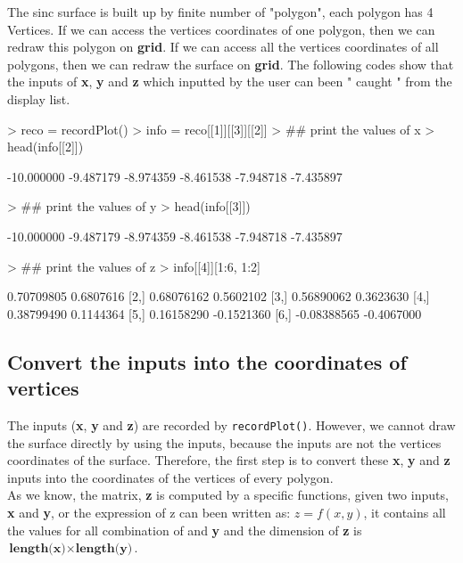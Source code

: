 \documentclass[11pt,twoside]{report}
\begin{document}
\newpage
The sinc surface is built up by finite number of "polygon", each polygon has 4 Vertices.
If we can access the vertices coordinates of one polygon, then we can redraw this polygon on \textbf{grid}. If we can access all the vertices coordinates of all polygons, then we can redraw the surface on \textbf{grid}. The following codes show that the inputs of \textbf{x}, \textbf{y} and \textbf{z} which inputted by the user can been " caught " from the display list.
\begin{Schunk}
\begin{Sinput}
> reco = recordPlot()
> info = reco[[1]][[3]][[2]]
> ## print the values of x
> head(info[[2]])
\end{Sinput}
\begin{Soutput}
[1] -10.000000  -9.487179  -8.974359  -8.461538  -7.948718  -7.435897
\end{Soutput}
\begin{Sinput}
> ## print the values of y
> head(info[[3]])
\end{Sinput}
\begin{Soutput}
[1] -10.000000  -9.487179  -8.974359  -8.461538  -7.948718  -7.435897
\end{Soutput}
\begin{Sinput}
> ## print the values of z
> info[[4]][1:6, 1:2]
\end{Sinput}
\begin{Soutput}
            [,1]       [,2]
[1,]  0.70709805  0.6807616
[2,]  0.68076162  0.5602102
[3,]  0.56890062  0.3623630
[4,]  0.38799490  0.1144364
[5,]  0.16158290 -0.1521360
[6,] -0.08388565 -0.4067000
\end{Soutput}
\end{Schunk}
\subsection{Convert the inputs into the coordinates of vertices}
The inputs (\textbf{x}, \textbf{y} and \textbf{z}) are recorded by \texttt{recordPlot()}. However, we cannot draw the surface directly by using the inputs, because the inputs are not the vertices coordinates of the surface. Therefore, the first step is to convert these \textbf{x}, \textbf{y} and \textbf{z} inputs into the coordinates of the vertices of every polygon.\\

As we know, the matrix, \textbf{z} is computed by a specific functions, given two inputs, \textbf{x} and \textbf{y}, or the expression of z can been written as: $z = f(x,y)$, it contains all the values for all combination of  and \textbf{y} and the dimension of \textbf{z} is $ \textbf{length(x)} \times \textbf{length(y)}$.\\
\end{document}
